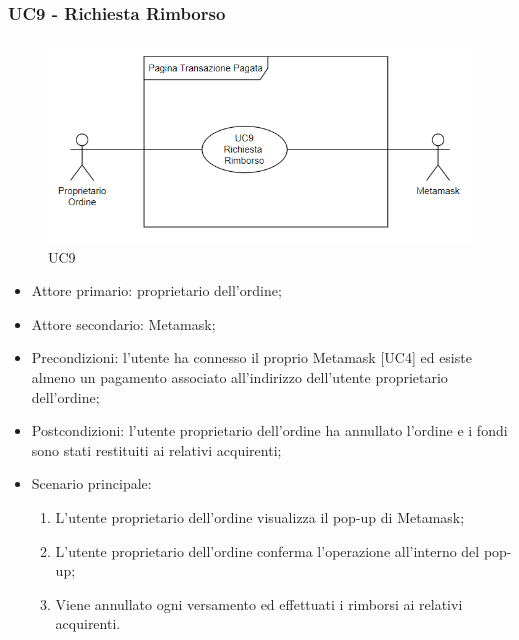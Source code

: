 \subsubsection{UC9 - Richiesta Rimborso}

\begin{figure}[H]
    \centering
    \includegraphics[scale=0.8]{immagini/UC9.png}
    \caption{UC9}
\end{figure}

\begin{itemize}
    \item Attore primario: proprietario dell'ordine;
    \item Attore secondario: Metamask\glo{};
    \item Precondizioni: l'utente ha connesso il proprio Metamask\glo{} [UC4] ed esiste almeno un pagamento associato all'indirizzo dell'utente proprietario dell'ordine;
    \item Postcondizioni: l'utente proprietario dell'ordine ha annullato l'ordine e i fondi sono stati restituiti ai relativi acquirenti;
    \item Scenario principale:
          \begin{enumerate}
              \item L'utente proprietario dell'ordine visualizza il pop-up di Metamask\glo{};
              \item L'utente proprietario dell'ordine conferma l'operazione all'interno del pop-up;
              \item Viene annullato ogni versamento ed effettuati i rimborsi ai relativi acquirenti.
          \end{enumerate}
\end{itemize}

\clearpage
